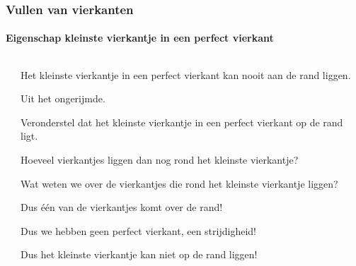 \begin{frame}
  \frametitle{Vullen van vierkanten}
  \framesubtitle{Eigenschap kleinste vierkantje in een perfect vierkant}
  \begin{columns}
    \begin{column}{0.5\textwidth}
      
    \end{column}
    \begin{column}{0.5\textwidth}
    {\scriptsize
      \begin{stelling}
      Het kleinste vierkantje in een perfect vierkant kan nooit aan de rand liggen.
      \end{stelling}
      {\tiny
        \begin{list}{}{\leftmargin=0pt}
          \pause
          \item Uit het ongerijmde.
          \item Veronderstel dat het kleinste vierkantje in een perfect vierkant op de rand ligt.
          \pause
          \item Hoeveel vierkantjes liggen dan nog rond het kleinste vierkantje?
          \item Wat weten we over de vierkantjes die rond het kleinste vierkantje liggen?
          \pause
          \item Dus \'e\'en van de vierkantjes komt over de rand!
          \pause
          \item Dus we hebben geen perfect vierkant, een strijdigheid!
          \item Dus het kleinste vierkantje kan niet op de rand liggen!
        \end{list}
      }
    }
    \end{column}
  \end{columns}  
\end{frame}
